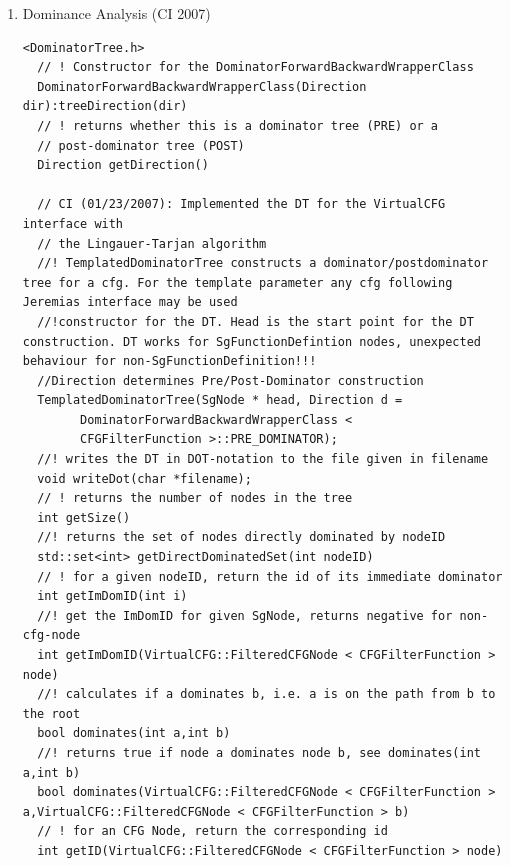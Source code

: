 \begin{enumerate}
\begin{enumerate}
\begin{lstlisting}
<DefUseAnalysis_perFunction.h>
  FilteredCFGNode < IsDFAFilter > run(SgFunctionDefinition* function, bool& abortme);

      \end{lstlisting}

      \item Dominance Analysis (CI 2007)
      \begin{lstlisting}
<DominatorTree.h>
  // ! Constructor for the DominatorForwardBackwardWrapperClass
  DominatorForwardBackwardWrapperClass(Direction dir):treeDirection(dir)
  // ! returns whether this is a dominator tree (PRE) or a
  // post-dominator tree (POST)
  Direction getDirection()

  // CI (01/23/2007): Implemented the DT for the VirtualCFG interface with
  // the Lingauer-Tarjan algorithm
  //! TemplatedDominatorTree constructs a dominator/postdominator tree for a cfg. For the template parameter any cfg following Jeremias interface may be used
  //!constructor for the DT. Head is the start point for the DT construction. DT works for SgFunctionDefintion nodes, unexpected behaviour for non-SgFunctionDefinition!!!
  //Direction determines Pre/Post-Dominator construction
  TemplatedDominatorTree(SgNode * head, Direction d =
		DominatorForwardBackwardWrapperClass <
		CFGFilterFunction >::PRE_DOMINATOR);
  //! writes the DT in DOT-notation to the file given in filename		
  void writeDot(char *filename);
  // ! returns the number of nodes in the tree
  int getSize()
  //! returns the set of nodes directly dominated by nodeID
  std::set<int> getDirectDominatedSet(int nodeID)
  // ! for a given nodeID, return the id of its immediate dominator
  int getImDomID(int i)
  //! get the ImDomID for given SgNode, returns negative for non-cfg-node
  int getImDomID(VirtualCFG::FilteredCFGNode < CFGFilterFunction > node)
  //! calculates if a dominates b, i.e. a is on the path from b to the root
  bool dominates(int a,int b)
  //! returns true if node a dominates node b, see dominates(int a,int b)		
  bool dominates(VirtualCFG::FilteredCFGNode < CFGFilterFunction > a,VirtualCFG::FilteredCFGNode < CFGFilterFunction > b)
  // ! for an CFG Node, return the corresponding id
  int getID(VirtualCFG::FilteredCFGNode < CFGFilterFunction > node)


\end{lstlisting}
\end{enumerate}
\end{enumerate}
